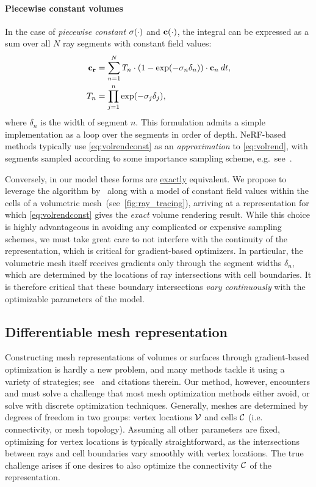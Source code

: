 \paragraph{Piecewise constant volumes}
%
In the case of \textit{piecewise constant} $\sigma(\cdot)$ and $\mathbf{c}(\cdot)$, the integral can be expressed as a sum over all $N$ ray segments with constant field values:
%
\begin{align}
\mathbf{c}_{\mathbf{r}} &= \sum_{n=1}^{N} T_n \cdot (1 - \textrm{exp}(-\sigma_n \delta_n)) \cdot \mathbf{c}_n \: dt, \label{eq:volrendconst}\\
T_n &= \prod_{j=1}^n \textrm{exp}(-\sigma_j \delta_j),
\end{align}
%
where $\delta_n$ is the width of segment $n$.
This formulation admits a simple implementation as a loop over the segments in order of depth.
NeRF-based methods typically use \cref{eq:volrendconst} as an \textit{approximation} to \cref{eq:volrend}, with segments sampled according to some importance sampling scheme, e.g.~see~\cite{mipnerf360}.


Conversely, in our model these forms are \ul{exactly} equivalent.
We propose to leverage the algorithm by~\citet{ray_plane} along with a model of constant field values within the cells of a volumetric mesh~(see~\cref{fig:ray_tracing}), arriving at a representation for which \cref{eq:volrendconst} gives the \textit{exact} volume rendering result.
While this choice is highly advantageous in avoiding any complicated or expensive sampling schemes, we must take great care to not interfere with the continuity of the representation, which is critical for gradient-based optimizers.
In particular, the volumetric mesh itself receives gradients only through the segment widths $\delta_n$, which are determined by the locations of ray intersections with cell boundaries.
It is therefore critical that these boundary intersections \textit{vary continuously} with the optimizable parameters of the model.

\subsection{Differentiable mesh representation}

Constructing mesh representations of volumes or surfaces through gradient-based optimization is hardly a new problem, and many methods tackle it using a variety of strategies; see~\citet{dmtet} and citations therein.
Our method, however, encounters and must solve a challenge that most mesh optimization methods either avoid, or solve with discrete optimization techniques.
Generally, meshes are determined by degrees of freedom in two groups: vertex locations $\mathcal{V}$ and cells $\mathcal{C}$ (i.e. connectivity, or mesh topology).
Assuming all other parameters are fixed, optimizing for vertex locations is typically straightforward, as the intersections between rays and cell boundaries vary smoothly with vertex locations.
The true challenge arises if one desires to also 
optimize the connectivity $\mathcal{C}$ of the representation.


